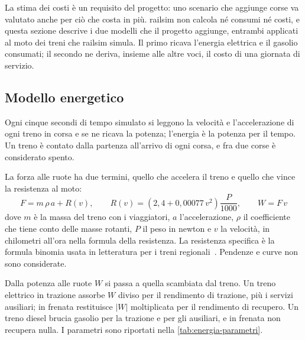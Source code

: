 La stima dei costi è un requisito del progetto: uno scenario che aggiunge corse va valutato anche per ciò che costa in più. railsim non calcola né consumi né costi, e questa sezione descrive i due modelli che il progetto aggiunge, entrambi applicati al moto dei treni che railsim simula. Il primo ricava l'energia elettrica e il gasolio consumati; il secondo ne deriva, insieme alle altre voci, il costo di una giornata di servizio.
\subsection{Modello energetico}
Ogni cinque secondi di tempo simulato si leggono la velocità e l'accelerazione di ogni treno in corsa e se ne ricava la potenza; l'energia è la potenza per il tempo. Un treno è contato dalla partenza all'arrivo di ogni corsa, e fra due corse è considerato spento.

La forza alle ruote ha due termini, quello che accelera il treno e quello che vince la resistenza al moto:
\begin{equation}
	F = m \, \rho \, a + R(v), \qquad R(v) = \left(2{,}4 + 0{,}00077\, v^2\right) \frac{P}{1000}, \qquad W = F \, v
\end{equation}
dove $m$ è la massa del treno con i viaggiatori, $a$ l'accelerazione, $\rho$ il coefficiente che tiene conto delle masse rotanti, $P$ il peso in newton e $v$ la velocità, in chilometri all'ora nella formula della resistenza. La resistenza specifica è la formula binomia usata in letteratura per i treni regionali~\cite{dallachiara2015consumo}. Pendenze e curve non sono considerate.

Dalla potenza alle ruote $W$ si passa a quella scambiata dal treno. Un treno elettrico in trazione assorbe $W$ diviso per il rendimento di trazione, più i servizi ausiliari; in frenata restituisce $|W|$ moltiplicata per il rendimento di recupero. Un treno diesel brucia gasolio per la trazione e per gli ausiliari, e in frenata non recupera nulla. I parametri sono riportati nella \cref{tab:energia-parametri}.

